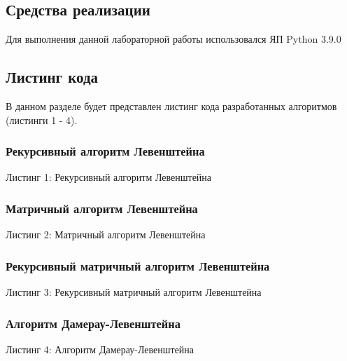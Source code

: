 \documentclass[12pt,a4paper]{article}
\begin{document}
\subsection{Средства реализации}
Для выполнения данной лабораторной работы использовался ЯП Python 3.9.0 \\
\subsection{Листинг кода}
В данном разделе будет представлен листинг кода разработанных алгоритмов (листинги 1 - 4).\\

\subsubsection{Рекурсивный алгоритм Левенштейна}
\begin{center}
	Листинг 1: Рекурсивный алгоритм Левенштейна
	
\end{center}
\clearpage

\subsubsection{Матричный алгоритм Левенштейна}
\begin{center}
	Листинг 2: Матричный алгоритм Левенштейна
	
\end{center}

\subsubsection{Рекурсивный матричный алгоритм Левенштейна}
\begin{center}
	Листинг 3: Рекурсивный матричный алгоритм Левенштейна
	
\end{center}
\clearpage

\subsubsection{Алгоритм Дамерау-Левенштейна}
\begin{center}
	Листинг 4: Алгоритм Дамерау-Левенштейна
	
\end{center}
\end{document}
